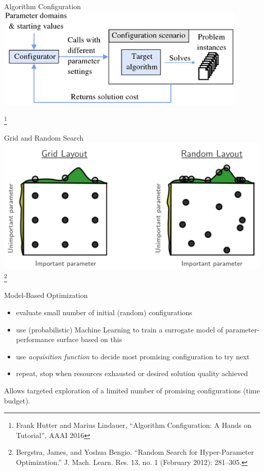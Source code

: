 \documentclass{cons-beamer}
\newcommand\blfootnote[1]{%
  \begingroup
  \renewcommand\thefootnote{}\footnote{
  \footnotesize #1
  \vspace*{1em}}%
  \addtocounter{footnote}{-1}%
  \endgroup
}
\begin{document}
\begin{frame}{Algorithm Configuration}
  \includegraphics[width=0.9\textwidth]{images/ac}

  \blfootnote{Frank Hutter and Marius Lindauer, ``Algorithm Configuration: A Hands on
  Tutorial'', AAAI 2016}
\end{frame}

\begin{frame}{Grid and Random Search}
  \includegraphics[height=.7\textheight]{images/grid-random}
  \blfootnote{Bergstra, James, and Yoshua Bengio. ``Random Search for
  Hyper-Parameter Optimization.'' J. Mach. Learn. Res. 13, no. 1 (February 2012):
  281–305.}
\end{frame}

\begin{frame}{Model-Based Optimization}
  \begin{itemize}
    \item evaluate small number of initial (random) configurations
    \item use (probabilistic) Machine Learning to train a surrogate model of parameter-performance surface based on this
    \item use \textit{acquisition function} to decide most promising configuration to try next
    \item repeat, stop when resources exhausted or desired solution quality achieved
  \end{itemize}
  \vspace{1em}

  Allows targeted exploration of a limited number of promising configurations (time budget).
\end{frame}
\end{document}
